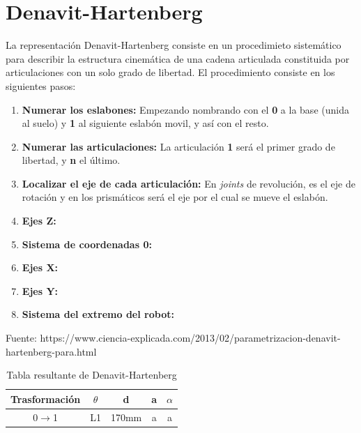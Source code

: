 \section{Denavit-Hartenberg}
La representación Denavit-Hartenberg consiste en un procedimieto sistemático para describir la estructura cinemática de una cadena 
articulada constituida por articulaciones con un solo grado de libertad. El procedimiento consiste en los siguientes pasos:
\begin{enumerate}
\item \textbf{Numerar los eslabones:} Empezando nombrando con el \textbf{0} a la base (unida al suelo) y \textbf{1} al siguiente eslabón movil, y así con el resto.
\item \textbf{Numerar las articulaciones:} La articulación \textbf{1} será el primer grado de libertad, y \textbf{n} el último.
\item \textbf{Localizar el eje de cada articulación:} En \textit{joints} de revolución, es el eje de rotación y en los prismáticos será 
el eje por el cual se mueve el eslabón.
\item \textbf{Ejes Z:}
\item \textbf{Sistema de coordenadas 0:}
\item \textbf{Ejes X:}
\item \textbf{Ejes Y:}
\item \textbf{Sistema del extremo del robot:}


\end{enumerate}
Fuente: https://www.ciencia-explicada.com/2013/02/parametrizacion-denavit-hartenberg-para.html

\begin{table}[H]
\begin{center}
\begin{tabular}{|c|c|c|c|c|}
\hline
\textbf{Trasformación} & \textbf{$\theta$} & \textbf{d} & \textbf{a} & \textbf{$\alpha$}\\
\hline
0$\rightarrow$1 & L1 & 170mm & a & a \\
\hline
\end{tabular}
\caption{Tabla resultante de Denavit-Hartenberg}
\label{cuadro:tablaDH}
\end{center}
\end{table}
  
